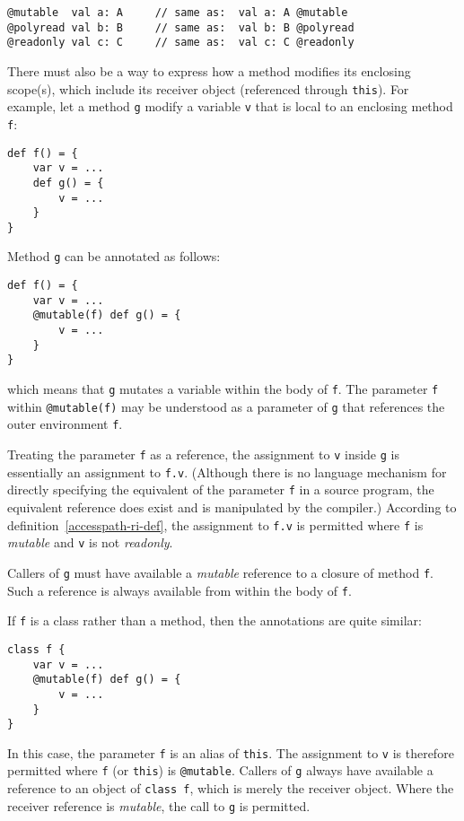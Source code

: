 \documentclass[letterpaper,11pt]{article}
\newcommand{\code}[1]{\lstinline$#1$}
\theoremstyle{definition}
\theoremstyle{remark}
\begin{document}
\begin{lstlisting}
@mutable  val a: A     // same as:  val a: A @mutable
@polyread val b: B     // same as:  val b: B @polyread
@readonly val c: C     // same as:  val c: C @readonly
\end{lstlisting}

There must also be a way to express how a method modifies its enclosing scope(s),
which include its receiver object (referenced through \code{this}).
For example, let a method \code{g} modify a variable \code{v} that is local
to an enclosing method \code{f}:
\begin{lstlisting}
def f() = {
	var v = ...
	def g() = {
		v = ...
	}
}
\end{lstlisting}

Method \code{g} can be annotated as follows:
\begin{lstlisting}
def f() = {
	var v = ...
	@mutable(f) def g() = {
		v = ...
	}
}
\end{lstlisting}
which means that \code{g} mutates a variable within the body of \code{f}.
The parameter \code{f} within \code{@mutable(f)}
may be understood as a parameter of \code{g} that references the outer environment \code{f}.

Treating the parameter \code{f} as a reference, the assignment to \code{v}
inside \code{g} is essentially an assignment to \code{f.v}.
(Although there is no language mechanism for directly specifying the equivalent of
the parameter \code{f} in a source program, the equivalent reference does exist
and is manipulated by the compiler.)
According to definition~\ref{accesspath-ri-def},
the assignment to \code{f.v} is permitted where \code{f} is \emph{mutable}
and \code{v} is not \emph{readonly}.

Callers of \code{g} must have available a \emph{mutable} reference to a closure
of method \code{f}.
Such a reference is always available from within the body of \code{f}.

If \code{f} is a class rather than a method, then the annotations are quite similar:
\begin{lstlisting}
class f {
	var v = ...
	@mutable(f) def g() = {
		v = ...
	}
}
\end{lstlisting}
In this case, the parameter \code{f} is an alias of \code{this}.
The assignment to \code{v} is therefore permitted where
\code{f} (or \code{this}) is \code{@mutable}.
Callers of \code{g} always have available a reference to an object of
\mbox{\code{class f}}, which is merely the receiver object.
Where the receiver reference is \emph{mutable},
the call to \code{g} is permitted.
\end{document}
